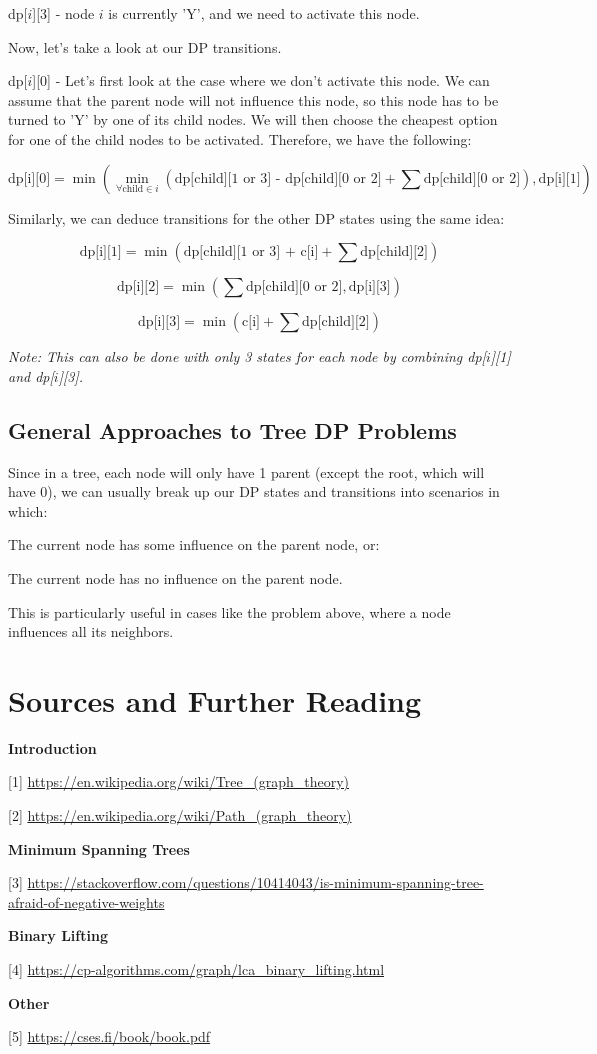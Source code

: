 \documentclass{article}
\begin{document}
dp[$i$][3] - node $i$ is currently 'Y', and we need to activate this node. 

Now, let's take a look at our DP transitions.

dp[$i$][0] - Let's first look at the case where we don't activate this node. We can assume that the parent node will not influence this node, so this node has to be turned to 'Y' by one of its child nodes. We will then choose the cheapest option for one of the child nodes to be activated. Therefore, we have the following:

$$
\text{dp[i][0]} = \min{(\min_{\forall{\text{child}\in{i}}}(\text{dp[child][1 or 3] - dp[child][0 or 2]} + \sum{\text{dp[child][0 or 2]}}), \text{dp[i][1]})}
$$


Similarly, we can deduce transitions for the other DP states using the same idea:

$$
\text{dp[i][1]} =\min(\text{dp[child][1 or 3] + c[i]} + \sum{\text{dp[child][2]}})
$$

$$
\text{dp[i][2]} =\min(\sum{\text{dp[child][0 or 2]}}, \text{dp[i][3]})
$$

$$
\text{dp[i][3]} =\min(\text{c[i]} + \sum{\text{dp[child][2]}})
$$



\textit{Note: This can also be done with only 3 states for each node by combining dp[$i$][1] and dp[$i$][3].}




\subsection{General Approaches to Tree DP Problems}
Since in a tree, each node will only have 1 parent (except the root, which will have 0), we can usually break up our DP states and transitions into scenarios in which:

The current node has some influence on the parent node, or:

The current node has no influence on the parent node.

This is particularly useful in cases like the problem above, where a node influences all its neighbors.


\section{Sources and Further Reading}

\textbf{Introduction}

[1] \url{https://en.wikipedia.org/wiki/Tree_(graph_theory)}

[2] \url{https://en.wikipedia.org/wiki/Path_(graph_theory)}

\textbf{Minimum Spanning Trees}

[3] \url{https://stackoverflow.com/questions/10414043/is-minimum-spanning-tree-afraid-of-negative-weights}

\textbf{Binary Lifting}

[4] \url{https://cp-algorithms.com/graph/lca_binary_lifting.html}

\textbf{Other}

[5] \url{https://cses.fi/book/book.pdf}
\end{document}
